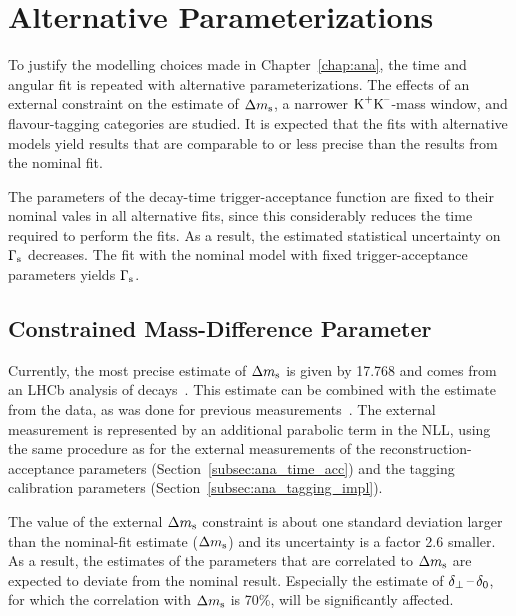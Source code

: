 \section{Alternative Parameterizations}
\label{sec:result_altParam}

To justify the modelling choices made in Chapter~\ref{chap:ana}, the time and angular fit is repeated with alternative parameterizations.
The effects of an external constraint on the estimate of $\Delta m_\text{s}$, a narrower $\text{K}^\text{+}\text{K}^\text{--}$-mass window, and flavour-tagging categories are studied.
It is expected that the fits with alternative models yield results that are comparable to or less precise than the results from the nominal
fit.

The parameters of the decay-time trigger-acceptance function are fixed to their nominal vales in all alternative fits, since this
considerably reduces the time required to perform the fits. As a result, the estimated statistical uncertainty on $\Gamma_\text{s}$ decreases. The fit
with the nominal model with fixed trigger-acceptance parameters yields $\Gamma_\text{s}$\unitsp\invps.


\subsection{Constrained Mass-Difference Parameter}
\label{subsec:result_altParam_Delm}

Currently, the most precise estimate of $\Delta m_\text{s}$ is given by 17.768\unitsp\invps{} and comes from an LHCb analysis of
\BstoDsmpip{} decays~\cite{LHCb-PAPER-2013-006}. This estimate can be combined with the estimate from the \BstoJpsiKK{} data, as
was done for previous measurements~\cite{LHCb-PAPER-2011-021,*LHCb-ANA-2011-036,LHCb-PAPER-2013-002,*LHCb-ANA-2012-067}.
The external measurement is represented by an additional parabolic term in the NLL, using the same procedure as for the external
measurements of the reconstruction-acceptance parameters (Section~\ref{subsec:ana_time_acc}) and the tagging calibration parameters
(Section~\ref{subsec:ana_tagging_impl}).

The value of the external $\Delta m_\text{s}$ constraint is about one standard deviation larger than the nominal-fit estimate
($\Delta m_\text{s}$\unitsp\invps) and its uncertainty is a factor 2.6 smaller. As a result, the estimates of the parameters
that are correlated to $\Delta m_\text{s}$ are expected to deviate from the nominal result. Especially the estimate of $\delta_{\perp}\,\text{--}\,\delta_{0}$, for which the
correlation with $\Delta m_\text{s}$ is 70\%, will be significantly affected.

